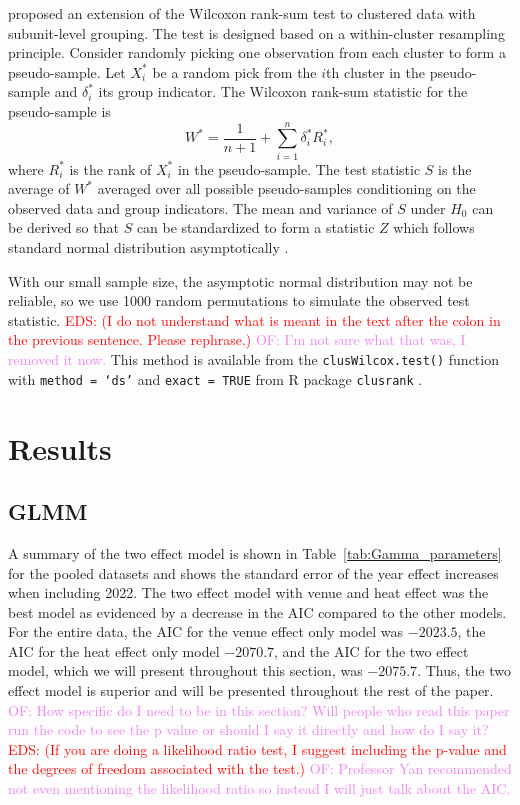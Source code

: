 \documentclass[12pt, letterpaper, titlepage]{article}
\newcommand{\eds}[1]{\textcolor{red}{EDS: (#1)}}
\newcommand{\of}[1]{\textcolor{violet}{OF: #1}}
\begin{document}
\citet{datta2005rank} proposed an extension of the Wilcoxon rank-sum test to
clustered data with subunit-level grouping. The test is designed based on a
within-cluster resampling principle. Consider randomly picking one observation
from each cluster to form a pseudo-sample. Let $X_i^*$ be a random pick from the
$i$th cluster in the pseudo-sample and $\delta_i^*$ its group indicator. The
Wilcoxon rank-sum statistic for the pseudo-sample is
\[
W^* = \frac{1}{n + 1} + \sum_{i=1}^{n} \delta_{i}^{*} R_{i}^{*},
\]
where $R_{i}^{*}$ is the rank of $X_{i}^{*}$ in the pseudo-sample.
The test statistic $S$ is the average of $W^*$ averaged over all possible
pseudo-samples conditioning on the observed data and group indicators.
The mean and variance of $S$ under $H_0$ can be derived so that $S$ can be
standardized to form a statistic $Z$ which follows standard normal distribution
asymptotically \citep[p.910]{datta2005rank}.


With our small sample size, the asymptotic normal distribution may not be
reliable, so we use 1000 random permutations to simulate the observed test 
statistic.
\eds{I do not understand what is meant in the text after the colon in the 
previous sentence.  Please rephrase.}
\of{I'm not sure what that was, I removed it now.}
This method is available from the \texttt{clusWilcox.test()} function
with \texttt{method = `ds'} and \texttt{exact = TRUE} from R package
\texttt{clusrank} \citep{jiang2020wilcoxon}.  


\section{Results} \label{sec:Results}

\subsection{GLMM} \label{subsec:Results_GLMM}


A summary of the two effect model is shown in Table~\ref{tab:Gamma_parameters}
for the pooled datasets and shows the standard error of the year
effect increases when including 2022.  The two effect model with venue and heat
effect was the best model as evidenced by a decrease in the AIC compared to the
other models. For the entire data, the AIC for the venue effect only model was
$-2023.5$, the AIC for the heat effect only model $-2070.7$, and the AIC for the 
two effect model, which we will present throughout this section, was $-2075.7$. 
Thus, the two effect model is superior and will be presented throughout the rest
of the paper.
\of{How specific do I need to be in this section? Will people who read this paper
run the code to see the p value or should I say it directly and how do I say it?}
\eds{If you are doing a likelihood ratio test, I suggest including the p-value 
and the degrees of freedom associated with the test.}
\of{Professor Yan recommended not even mentioning the likelihood ratio so
instead I will just talk about the AIC.}
\end{document}
